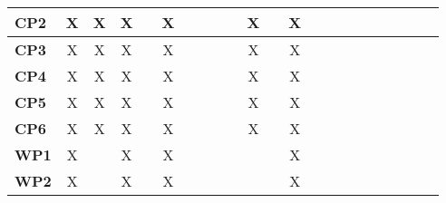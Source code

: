 \documentclass[12pt]{article}
\begin{document}
\begin{table}[H]
\begin{adjustwidth}{-0.8in}{-1.2in}
{\begin{tabular}{c|c|c|c|c|c|c|c|c|c|c|c|c|c|c|c|c|c|c|c|c|c}
\multicolumn{1}{|l|}{\textbf{CP2}}   &      X       &       X      &      X       &              &      X       &              &              &              &              &      X       &              &      X       &              &              &             &              &             &             &             &             \\ \hline
\multicolumn{1}{|l|}{\textbf{CP3}}   &      X       &       X      &      X       &              &      X       &              &              &              &              &      X       &              &      X       &              &              &             &              &             &             &             &             \\ \hline
\multicolumn{1}{|l|}{\textbf{CP4}}   &      X       &       X      &      X       &              &      X       &              &              &              &              &      X       &              &      X       &              &              &             &              &             &             &             &             \\ \hline
\multicolumn{1}{|l|}{\textbf{CP5}}   &      X       &       X      &      X       &              &      X       &              &              &              &              &      X       &              &      X       &              &              &             &              &             &             &             &             \\ \hline
\multicolumn{1}{|l|}{\textbf{CP6}}   &      X       &       X      &      X       &              &      X       &              &              &              &              &      X       &              &      X       &              &              &             &              &             &             &             &             \\ \hline
\multicolumn{1}{|l|}{\textbf{WP1}}   &      X       &              &      X       &              &      X       &              &              &              &              &              &              &      X       &              &              &             &              &             &             &             &             \\ \hline
\multicolumn{1}{|l|}{\textbf{WP2}}   &      X       &              &      X       &              &      X       &              &              &              &              &              &              &      X       &              &              &             &              &             &             &             &             \\ \hline

\end{tabular}}
\end{adjustwidth}
\end{table}
\end{document}

